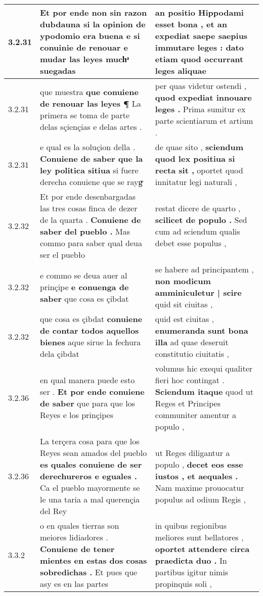 \begin{tabular}{|p{1cm}|p{6.5cm}|p{6.5cm}|}
3.2.31 & Et por ende non sin razon dubdauna si la opinion de ypodomio era buena \textbf{ e si conuinie de renouar } e mudar las leyes muchͣ suegadas & an positio Hippodami esset bona , \textbf{ et an expediat saepe saepius immutare leges : } dato etiam quod occurrant leges aliquae \\\hline
3.2.31 & que muestra \textbf{ que conuiene de renouar las leyes ¶ } La primera se toma de parte delas sçiençias e delas artes . & per quas videtur ostendi , \textbf{ quod expediat innouare leges . } Prima sumitur ex parte scientiarum et artium . \\\hline
3.2.31 & e qual es la soluçion della . \textbf{ Conuiene de saber que la ley politica sitiua } si fuere derecha conuiene que se raygͤ & de quae sito , \textbf{ sciendum quod lex positiua si recta sit , } oportet quod innitatur legi naturali , \\\hline
3.2.32 & Et por ende desenbargadas las tres cosas finca de dezer de la quarta . \textbf{ Conuiene de saber del pueblo . } Mas commo para saber qual deua ser el puebło & restat dicere de quarto , \textbf{ scilicet de populo . } Sed cum ad sciendum qualis debet esse populus , \\\hline
3.2.32 & e commo se deua auer al prinçipe \textbf{ e conuenga de saber } que cosa es çibdat & se habere ad principantem , \textbf{ non modicum amminiculetur | scire } quid sit ciuitas , \\\hline
3.2.32 & que cosa es çibdat \textbf{ conuiene de contar todos aquellos bienes } aque sirue la fechura dela çibdat & quid est ciuitas , \textbf{ enumeranda sunt bona illa } ad quae deseruit constitutio ciuitatis , \\\hline
3.2.36 & en qual manera puede esto ser . \textbf{ Et por ende conuiene de saber } que para que los Reyes e los prinçipes & volumus hic exequi qualiter fieri hoc contingat . \textbf{ Sciendum itaque } quod ut Reges et Principes communiter amentur a populo , \\\hline
3.2.36 & La terçera cosa para que los Reyes sean amados del pueblo \textbf{ es quales conuiene de ser derechureros e eguales . } Ca el pueblo mayormente se le una taria a mal querençia del Rey & ut Reges diligantur a populo , \textbf{ decet eos esse iustos , et aequales . } Nam maxime prouocatur populus ad odium Regis , \\\hline
3.3.2 & o en quales tierras son meiores lidiadores . \textbf{ Conuiene de tener mientes en estas dos cosas sobredichas . } Et pues que asy es en las partes & in quibus regionibus meliores sunt bellatores , \textbf{ oportet attendere circa praedicta duo . } In partibus igitur nimis propinquis soli , \\\hline

\end{tabular}
